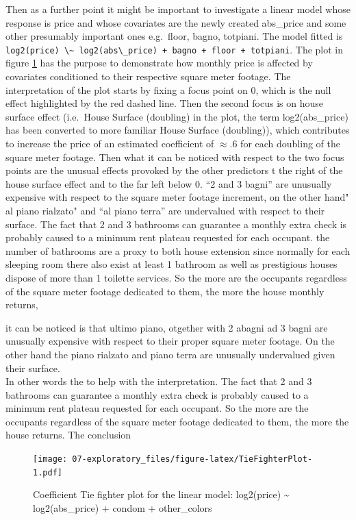 \documentclass[
  12pt,
  a4paper,
  oneside]{book}
\newcommand{\passthrough}[1]{#1}
\theoremstyle{definition}
\theoremstyle{definition}
\theoremstyle{definition}
\theoremstyle{remark}
\begin{document}
Then as a further point it might be important to investigate a linear model whose response is price and whose covariates are the newly created abs\_price and some other presumably important ones e.g.~floor, bagno, totpiani. The model fitted is \passthrough{\lstinline!log2(price) \~ log2(abs\_price) + bagno + floor + totpiani!}.
The plot in figure \ref{fig:TieFighterPlot} has the purpose to demonstrate how monthly price is affected by covariates conditioned to their respective square meter footage. The interpretation of the plot starts by fixing a focus point on 0, which is the null effect highlighted by the red dashed line. Then the second focus is on house surface effect (i.e.~House Surface (doubling) in the plot, the term log2(abs\_price) has been converted to more familiar House Surface (doubling)), which contributes to increase the price of an estimated coefficient of \(\approx .6\) for each doubling of the square meter footage. Then what it can be noticed with respect to the two focus points are the unusual effects provoked by the other predictors t the right of the house surface effect and to the far left below 0. ``2 and 3 bagni'' are unusually expensive with respect to the square meter footage increment, on the other hand" al piano rialzato" and ``al piano terra'' are undervalued with respect to their surface. The fact that 2 and 3 bathrooms can guarantee a monthly extra check is probably caused to a minimum rent plateau requested for each occupant. the number of bathrooms are a proxy to both house extension since normally for each sleeping room there also exist at least 1 bathroom as well as prestigious houses dispose of more than 1 toilette services. So the more are the occupants regardless of the square meter footage dedicated to them, the more the house monthly returns,

it can be noticed is that ultimo piano, otgether with 2 abagni ad 3 bagni are unusually expensive with respect to their proper square meter footage. On the other hand the piano rialzato and piano terra are unusually undervalued given their surface.\\
In other words the to help with the interpretation. The fact that 2 and 3 bathrooms can guarantee a monthly extra check is probably caused to a minimum rent plateau requested for each occupant. So the more are the occupants regardless of the square meter footage dedicated to them, the more the house returns. The conclusion

\begin{figure}
\centering
\texttt{[image: 07-exploratory\_files/figure-latex/TieFighterPlot-1.pdf]}
\caption{\label{fig:TieFighterPlot}Coefficient Tie fighter plot for the linear model: log2(price) \textasciitilde{} log2(abs\_price) + condom + other\_colors}
\end{figure}
\end{document}
